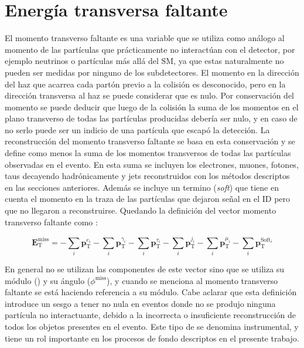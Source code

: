 \section{Energía transversa faltante}\label{sec:met}


El momento transverso faltante es una variable que se utiliza como análogo al momento de las partículas que prácticamente no interactúan con el detector, por ejemplo neutrinos o partículas más allá del SM, ya que estas naturalmente no pueden ser medidas por ninguno de los subdetectores. El momento en la dirección del haz que acarrea cada partón previo a la colisión es desconocido, pero en la dirección transversa al haz se puede considerar que es nulo. Por conservación del momento se puede deducir que luego de la colisión la suma de los momentos en el plano transverso de todas las partículas producidas debería ser nulo, y en caso de no serlo puede ser un indicio de una partícula que escapó la detección. La reconstrucción del momento transverso faltante se basa en esta conservación y se define como menos la suma de los momentos transversos de todas las partículas observadas en el evento. En esta suma se incluyen los electrones, muones, fotones, taus decayendo hadrónicamente y jets reconstruidos con los métodos descriptos en las secciones anteriores. Además se incluye un termino (\textit{soft}) que tiene en cuenta el momento en la traza de las partículas que dejaron señal en el ID pero que no llegaron a reconstruirse. Quedando la definición del vector momento transverso faltante como \cite{PERF-2016-07}:

\begin{equation}
\textbf{E}_{\text{T}}^{\text{miss}} = -\sum_{i}\textbf{p}_{\text{T}}^{e_i}-\sum_{i}\textbf{p}_{\text{T}}^{\gamma_i}-\sum_{i}\textbf{p}_{\text{T}}^{\tau_i}-\sum_{i}\textbf{p}_{\text{T}}^{j_i}-\sum_{i}\textbf{p}_{\text{T}}^{\mu_i}-\sum_{i}\textbf{p}_{\text{T}}^{\text{Soft}_i}
\end{equation}


En general no se utilizan las componentes de este vector sino que se utiliza su módulo (\met) y su ángulo ($\phi^{\text{miss}}$), y cuando se menciona al momento transverso faltante se está haciendo referencia a su módulo. Cabe aclarar que esta definición introduce un sesgo a tener \met no nula en eventos donde no se produjo ninguna partícula no interactuante, debido a la incorrecta o insuficiente reconstrucción de todos los objetos presentes en el evento. Este tipo de \met se denomina instrumental, y tiene un rol importante en los procesos de fondo descriptos en el presente trabajo.

